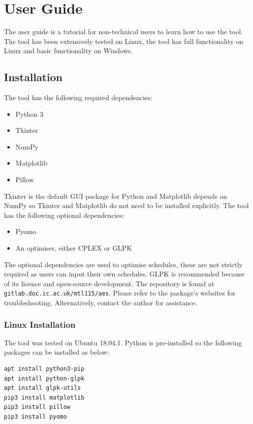 \chapter{User Guide}
\label{userguide}

The user guide is a tutorial for non-technical users to learn how to use the tool. The tool has been extensively tested on Linux, the tool has full functionality on Linux and basic functionality on Windows.

\section{Installation}

The tool has the following required dependencies:

\begin{itemize}
	\item Python 3
	\item Tkinter
	\item NumPy
	\item Matplotlib
	\item Pillow
\end{itemize}

Tkinter is the default GUI package for Python and Matplotlib depends on NumPy so Tkinter and Matplotlib do not need to be installed explicitly. The tool has the following optional dependencies:

\begin{itemize}
	\item Pyomo
	\item An optimiser, either CPLEX or GLPK
\end{itemize}

The optional dependencies are used to optimise schedules, these are not strictly required as users can input their own schedules. GLPK is recommended because of its licence and open-source development. The repository is found at \texttt{gitlab.doc.ic.ac.uk/mtl115/aes}. Please refer to the package's websites for troubleshooting. Alternatively, contact the author for assistance.

\subsection{Linux Installation}

The tool was tested on Ubuntu 18.04.1. Python is pre-installed so the following packages can be installed as below:
\begin{verbatim}
apt install python3-pip
apt install python-glpk
apt install glpk-utils
pip3 install matplotlib
pip3 install pillow
pip3 install pyomo
\end{verbatim}

